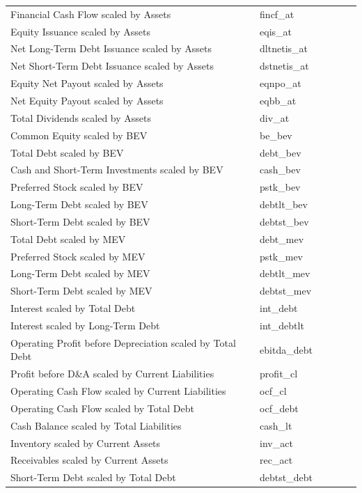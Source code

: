 \documentclass[12pt,title,fleqn]{article}
\begin{document}
\begin{longtable}{p{5cm}p{2cm}p{5cm}lll}
Financial Cash Flow scaled by Assets & fincf\_at & & & & \\
Equity Issuance scaled by Assets & eqis\_at & & & & \\
Net Long-Term Debt Issuance scaled by Assets & dltnetis\_at & & & & \\
Net Short-Term Debt Issuance scaled by Assets & dstnetis\_at & & & & \\
Equity Net Payout scaled by Assets & eqnpo\_at & & & & \\
Net Equity Payout scaled by Assets & eqbb\_at & & & & \\
Total Dividends scaled by Assets & div\_at & & & & \\
Common Equity scaled by BEV & be\_bev & & & & \\
Total Debt scaled by BEV & debt\_bev & & & & \\
Cash and Short-Term Investments scaled by BEV & cash\_bev & & & & \\
Preferred Stock scaled by BEV & pstk\_bev & & & & \\
Long-Term Debt scaled by BEV & debtlt\_bev & & & & \\
Short-Term Debt scaled by BEV & debtst\_bev & & & & \\
Total Debt scaled by MEV & debt\_mev & & & & \\
Preferred Stock scaled by MEV & pstk\_mev & & & & \\
Long-Term Debt scaled by MEV & debtlt\_mev & & & & \\
Short-Term Debt scaled by MEV & debtst\_mev & & & & \\
Interest scaled by Total Debt & int\_debt & & & & \\
Interest scaled by Long-Term Debt & int\_debtlt & & & & \\
Operating Profit before Depreciation scaled by Total Debt & ebitda\_debt & & & & \\
Profit before D\&A scaled by Current Liabilities & profit\_cl & & & & \\
Operating Cash Flow scaled by Current Liabilities & ocf\_cl & & & & \\
Operating Cash Flow scaled by Total Debt & ocf\_debt & & & & \\
Cash Balance scaled by Total Liabilities & cash\_lt & & & & \\
Inventory scaled by Current Assets & inv\_act & & & & \\
Receivables scaled by Current Assets & rec\_act & & & & \\
Short-Term Debt scaled by Total Debt & debtst\_debt & & & & \\

\end{longtable}
\end{document}
